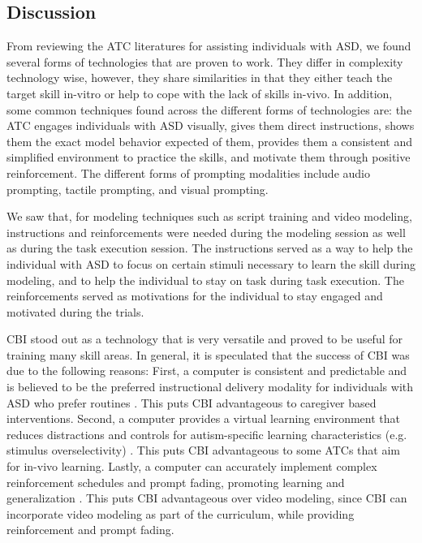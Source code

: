 \documentclass{ut-thesis}
\begin{document}
\subsection{Discussion}
\label{Sec:AT4ASDDiscussion}
From reviewing the ATC literatures for assisting individuals with ASD, we found several forms of technologies that are proven to work.  They differ in complexity technology wise, however, they share similarities in that they either teach the target skill in-vitro or help to cope with the lack of skills in-vivo.  In addition, some common techniques found across the different forms of technologies are: the ATC engages individuals with ASD visually, gives them direct instructions, shows them the exact model behavior expected of them, provides them a consistent and simplified environment to practice the skills, and motivate them through positive reinforcement.  The different forms of prompting modalities include audio prompting, tactile prompting, and visual prompting.

We saw that, for modeling techniques such as script training and video modeling, instructions and reinforcements were needed during the modeling session as well as during the task execution session.  The instructions served as a way to help the individual with ASD to focus on certain stimuli necessary to learn the skill during modeling, and to help the individual to stay on task during task execution.  The reinforcements served as motivations for the individual to stay engaged and motivated during the trials.

CBI stood out as a technology that is very versatile and proved to be useful for training many skill areas.  In general, it is speculated that the success of CBI was due to the following reasons: First, a computer is consistent and predictable and is believed to be the preferred instructional delivery modality for individuals with ASD who prefer routines \cite{ramdoss2011use}.  This puts CBI advantageous to caregiver based interventions.  Second, a computer provides a virtual learning environment that reduces distractions and controls for autism-specific learning characteristics (e.g. stimulus overselectivity) \cite{lovaas1979stimulus}.  This puts CBI advantageous to some ATCs that aim for in-vivo learning.  Lastly, a computer can accurately implement complex reinforcement schedules and prompt fading, promoting learning and generalization \cite{ramdoss2011useb}.  This puts CBI advantageous over video modeling, since CBI can incorporate video modeling as part of the curriculum, while providing reinforcement and prompt fading.
\end{document}
